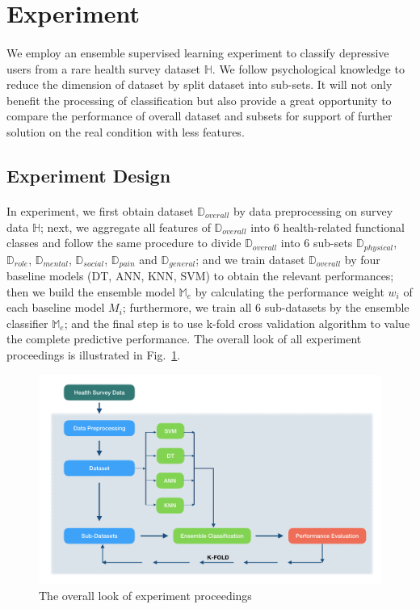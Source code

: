 \documentclass[runningheads]{llncs}
\begin{document}
\section{Experiment}
%
\paragraph{}
We employ an ensemble supervised learning experiment to classify depressive users from a rare health survey dataset $\mathbb{H}$. We follow psychological knowledge to reduce the dimension of dataset by split dataset into sub-sets. It will not only benefit the processing of classification but also provide a great opportunity to compare the performance of overall dataset and subsets for support of further solution on the real condition with less features.
%
\subsection{Experiment Design}
%
\paragraph{}
In experiment, we first obtain dataset $\mathbb{D}_{overall}$ by data preprocessing on survey data $\mathbb{H}$; next, we aggregate all features of $\mathbb{D}_{overall}$ into 6 health-related functional classes and follow the same procedure to divide $\mathbb{D}_{overall}$ into 6 sub-sets $\mathbb{D}_{physical}$, $\mathbb{D}_{role}$, $\mathbb{D}_{mental}$, $\mathbb{D}_{social}$, $\mathbb{D}_{pain}$ and $\mathbb{D}_{general}$; and we train dataset $\mathbb{D}_{overall}$ by four baseline models (DT, ANN, KNN, SVM) to obtain the relevant performances; then we build the ensemble model $\mathbb{M}_{e}$ by calculating the performance weight $w_{i}$ of each baseline model $M_{i} $; furthermore, we train all 6 sub-datasets by the ensemble classifier $\mathbb{M}_{e}$; and the final step is to use k-fold cross validation algorithm to value the complete predictive performance. The overall look of all experiment proceedings is illustrated in Fig.~\ref{fig4}. 
\begin{figure}[h]
\includegraphics[width=1\textwidth]{experiment.png}
\caption{The overall look of experiment proceedings} \label{fig4}
\end{figure}
%
\end{document}
